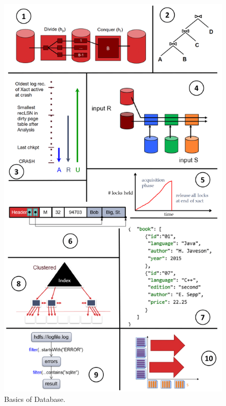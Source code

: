 \documentclass[10pt]{article}
\begin{document}
\begin{figure}
    \centering
    \includegraphics[width=.8\linewidth]{basics.png}
    \caption{Basics of Database.}
    \label{fig1}
\end{figure}
\newpage
\end{document}
